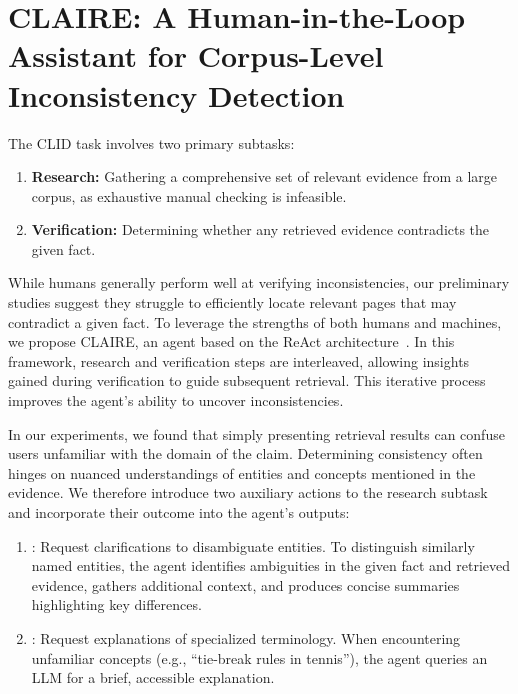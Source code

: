 \documentclass[11pt]{article}
\newcommand{\task}[0]{CLID\xspace}
\newcommand{\system}[0]{\textsc{CLAIRE}\xspace}
\newcommand{\action}[1]{%
\tcbox[colback=actionblue!20,colframe=actionblue!50!black,boxrule=0.3pt,arc=2pt,
top=-3.5pt,bottom=-3.5pt,left=0.5pt,right=0.5pt,
nobeforeafter,tcbox raise base]{\texttt{\strut #1}}%
}
\begin{document}


\section{\system: A Human-in-the-Loop Assistant for Corpus-Level Inconsistency Detection}

The \task task involves two primary subtasks:

\begin{enumerate}
\item \textbf{Research:} Gathering a comprehensive set of relevant evidence from a large corpus, as exhaustive manual checking is infeasible.
\item \textbf{Verification:} Determining whether any retrieved evidence contradicts the given fact.
\end{enumerate}

While humans generally perform well at verifying inconsistencies, our preliminary studies suggest they struggle to efficiently locate relevant pages that may contradict a given fact. To leverage the strengths of both humans and machines, we propose \system, an agent based on the ReAct architecture~\citep{yao2022react}. In this framework, research and verification steps are interleaved, allowing insights gained during verification to guide subsequent retrieval. This iterative process improves the agent's ability to uncover inconsistencies.

In our experiments, we found that simply presenting retrieval results can confuse users unfamiliar with the domain of the claim. Determining consistency often hinges on nuanced understandings of entities and concepts mentioned in the evidence. We therefore introduce two auxiliary actions to the research subtask and incorporate their outcome into the agent's outputs:

\begin{enumerate}
\item \action{clarify}:
Request clarifications to disambiguate entities.
To distinguish similarly named entities, the agent identifies ambiguities in the given fact and retrieved evidence, gathers additional context, and produces concise summaries highlighting key differences.
\item \action{explain}: Request explanations of specialized terminology. When encountering unfamiliar concepts (e.g., ``tie-break rules in tennis''), the agent queries an LLM for a brief, accessible explanation.
\end{enumerate}
\end{document}
